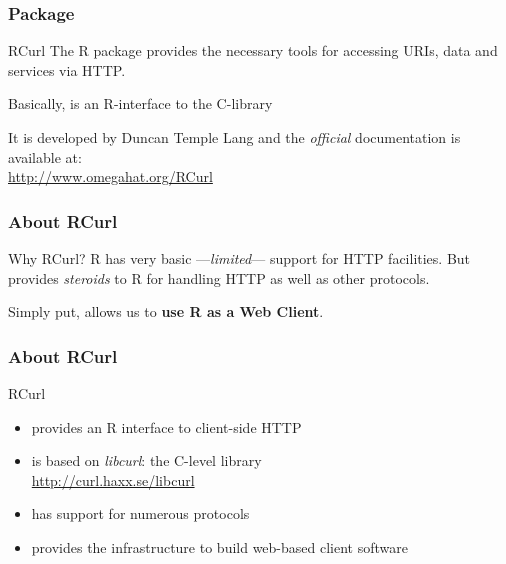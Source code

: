 \documentclass{beamer}\usepackage[]{graphicx}\usepackage[]{color}
\begin{document}

\begin{frame}
\frametitle{Package }

\begin{block}{RCurl}
The R package  provides the necessary tools for accessing URIs, data and services via HTTP.

\bigskip

Basically,  is an R-interface to the C-library  \\

\bigskip

It is developed by Duncan Temple Lang and the \textit{official} documentation is available at: \\
\url{http://www.omegahat.org/RCurl}

\end{block}

\end{frame}


\begin{frame}
\frametitle{About RCurl}

\begin{block}{Why RCurl?}
R has very basic ---\textit{limited}--- support for HTTP facilities. But  provides \textit{steroids} to R for handling HTTP as well as other protocols.

\bigskip

Simply put,  allows us to \textbf{use R as a Web Client}.
\end{block}

\end{frame}


\begin{frame}
\frametitle{About RCurl}

\begin{block}{RCurl}
\begin{itemize}
 \item provides an R interface to client-side HTTP
 \item is based on \textit{libcurl}: the  C-level library \\
{\scriptsize \url{http://curl.haxx.se/libcurl}}
 \item has support for numerous protocols \\
 \item provides the infrastructure to build web-based client software
\end{itemize}
\end{block}

\end{frame}
\end{document}
